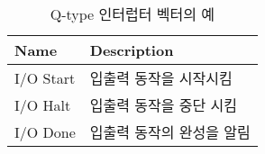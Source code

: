 %
%
\begin{table}[htbp]
\caption{Q-type 인터럽터 벡터의 예}\label{table:q-type}
   \begin{center}
   \begin{tabular}{|l|l|} \hline
	Name & Description \\
\hline \hline
	I/O Start & 입출력 동작을 시작시킴 \\
	I/O Halt & 입출력 동작을 중단 시킴 \\
	I/O Done & 입출력 동작의 완성을 알림 \\
\hline
   \end{tabular}
   \end{center}
\end{table}
%
%
